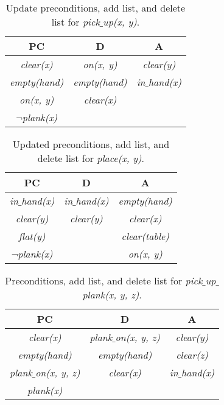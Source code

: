 \documentclass[11pt, letterpaper]{hw}
\begin{document}
\begin{enumerate}
\begin{table}[H]
\centering
{\renewcommand{\arraystretch}{1.2}%
\begin{tabular}{| c | c | c |}
\hline
\textbf{PC} & \textbf{D} & \textbf{A}\\
\hline
\textit{clear(x)} & \textit{on(x, y)} & \textit{clear(y)}\\ \hline
\textit{empty(hand)} & \textit{empty(hand)} & \textit{in$\_$hand(x)}\\ \hline
\textit{on(x, y)} & \textit{clear(x)} &  \\ \hline
$\neg$\textit{plank(x)} & & \\ \hline
\end{tabular}}
\caption{Update preconditions, add list, and delete list for \textit{pick$\_$up(x, y)}.}
\end{table}

\begin{table}[H]
\centering
{\renewcommand{\arraystretch}{1.2}%
\begin{tabular}{| c | c | c |}
\hline
\textbf{PC} & \textbf{D} & \textbf{A}\\
\hline
\textit{in$\_$hand(x)} & \textit{in$\_$hand(x)} & \textit{empty(hand)}\\ \hline
\textit{clear(y)} & \textit{clear(y)} & \textit{clear(x)}\\ \hline
\textit{flat(y)} &  & \textit{clear(table)} \\ \hline
$\neg$\textit{plank(x)}& & \textit{on(x, y)} \\ \hline
\end{tabular}}
\caption{Updated preconditions, add list, and delete list for \textit{place(x, y)}.}
\end{table}

\begin{table}[H]
\centering
{\renewcommand{\arraystretch}{1.2}%
\begin{tabular}{| c | c | c |}
\hline
\textbf{PC} & \textbf{D} & \textbf{A}\\
\hline
\textit{clear(x)} & \textit{plank$\_$on(x, y, z)} & \textit{clear(y)}\\ \hline
\textit{empty(hand)} & \textit{empty(hand)} & \textit{clear(z)}\\ \hline
\textit{plank$\_$on(x, y, z)} & \textit{clear(x)} &  \textit{in$\_$hand(x)}\\ \hline
\textit{plank(x)} & & \\ \hline
\end{tabular}}
\caption{Preconditions, add list, and delete list for \textit{pick$\_$up$\_$plank(x, y, z)}.}
\end{table}


\end{enumerate}
\end{document}
